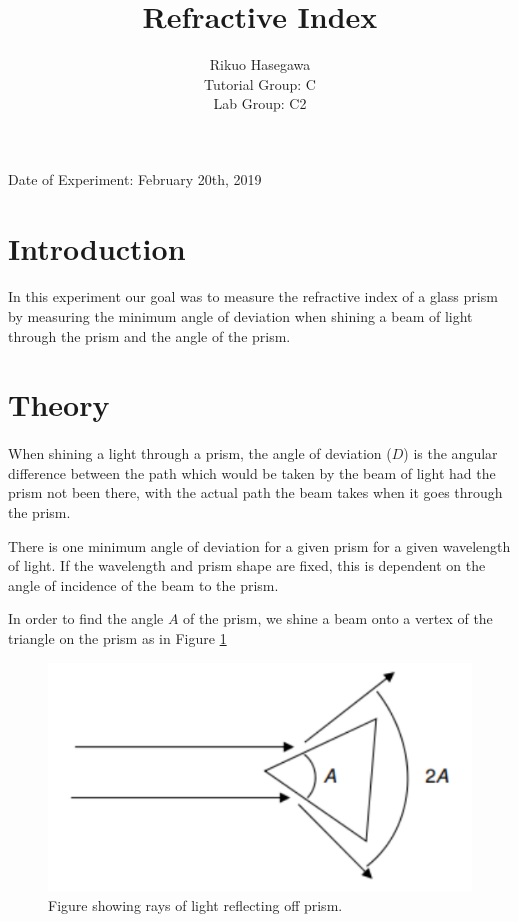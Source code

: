 \documentclass{article}
\title{Refractive Index}
\author{ Rikuo Hasegawa
  \\ Tutorial Group: C
  \\ Lab Group: C2 }
\begin{document}
\maketitle
\thispagestyle{fancy}
\vspace*{\fill}
\parbox{\linewidth}{\centering%
Date of Experiment: February 20th, 2019
}
\newpage


\section{Introduction}
\paragraph{}
In this experiment our goal was to measure the refractive index of a glass prism by measuring the minimum angle of deviation when shining a beam of light through the prism and the angle of the prism.

\section{Theory}
\paragraph{}
When shining a light through a prism, the angle of deviation ($D$) is the angular difference between the path which would be taken by the beam of light had the prism not been there, with the actual path the beam takes when it goes through the prism.

There is one minimum angle of deviation for a given prism for a given wavelength of light. If the wavelength and prism shape are fixed, this is dependent on the angle of incidence of the beam to the prism.

In order to find the angle $A$ of the prism, we shine a beam onto a vertex of the triangle on the prism as in Figure \ref{fig:prism}

\begin{figure}
  \includegraphics{./img/2A.pdf}
  \caption{Figure showing rays of light reflecting off prism.}
  \label{fig:prism}
\end{figure}
\end{document}
